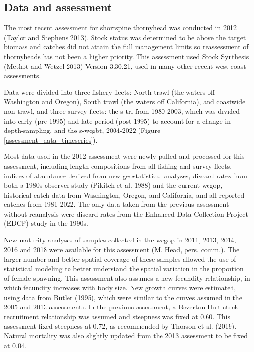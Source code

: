\documentclass[11pt,
  english,
  letterpaper,
]{article}
\begin{document}
\hypertarget{data-and-assessment}{%
\subsection*{Data and assessment}\label{data-and-assessment}}

The most recent assessment for shortspine thornyhead was conducted in 2012 (Taylor and Stephens 2013). Stock status was determined to be above the target biomass and catches did not attain the full management limits so reassessment of thornyheads has not been a higher priority. This assessment used Stock Synthesis (Methot and Wetzel 2013) Version 3.30.21, used in many other recent west coast assessments.

Data were divided into three fishery fleets: North trawl (the waters off Washington and Oregon), South trawl (the waters off California), and coastwide non-trawl, and three survey fleets: the \gls{s-tri} from 1980-2003, which was divided into early (pre-1995) and late period (post-1995) to account for a change in depth-sampling, and the \gls{s-wcgbt}, 2004-2022 (Figure \ref{assessment_data_timeseries}).

Most data used in the 2012 assessment were newly pulled and processed for this assessment, including length compositions from all fishing and survey fleets, indices of abundance derived from new geostatistical analyses, discard rates from both a 1980s observer study (Pikitch et al. 1988) and the current \gls{wcgop}, historical catch data from Washington, Oregon, and California, and all reported catches from 1981-2022. The only data taken from the previous assessment without reanalysis were discard rates from the Enhanced Data Collection Project (EDCP) study in the 1990s.

New maturity analyses of samples collected in the \gls{wcgop} in 2011, 2013, 2014, 2016 and 2018 were available for this assessment (M. Head, pers. comm.). The larger number and better spatial coverage of these samples allowed the use of statistical modeling to better understand the spatial variation in the proportion of female spawning. This assessment also assumes a new fecundity relationship, in which fecundity increases with body size. New growth curves were estimated, using data from Butler (1995), which were similar to the curves assumed in the 2005 and 2013 assessments. In the previous assessment, a Beverton-Holt stock recruitment relationship was assumed and steepness was fixed at 0.60. This assessment fixed steepness at 0.72, as recommended by Thorson et al. (2019). Natural mortality was also slightly updated from the 2013 assessment to be fixed at 0.04.
\end{document}
